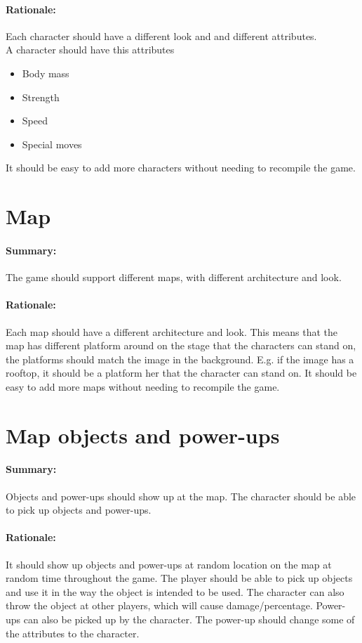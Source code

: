 	\paragraph{Rationale:}
		Each character should have a different look and and different attributes.\\
		A character should have this attributes
		\begin{itemize}
			\item Body mass
			\item Strength
			\item Speed
			\item Special moves
		\end{itemize}
		It should be easy to add more characters without needing to recompile the game.

\newpage
\section{Map}
	\paragraph{Summary:}
		The game should support different maps, with different architecture and look.
	\paragraph{Rationale:}
		Each map should have a different architecture and look. 
		This means that the map has different platform around on the stage that the characters can stand on, the platforms should match the image in the background. E.g. if the image has a rooftop, it should be a platform her that the character can stand on.
		It should be easy to add more maps without needing to recompile the game.

\section{Map objects and power-ups}
	\paragraph{Summary:}
		Objects and power-ups should show up at the map.
		The character should be able to pick up objects and power-ups.
	\paragraph{Rationale:}
		It should show up objects and power-ups at random location on the map at random time throughout the game. The player should be able to pick up objects and use it in the way the object is intended to be used. The character can also throw the object at other players, which will cause damage/percentage. Power-ups can also be picked up by the character. The power-up should change some of the attributes to the character.

